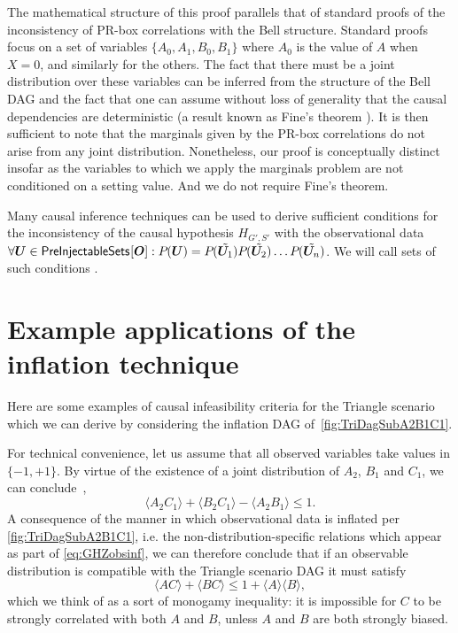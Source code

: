 The mathematical structure of this proof parallels that of standard proofs of the inconsistency of PR-box correlations with the Bell structure.  Standard proofs focus on a set of variables $\{A_0, A_1, B_0, B_1\}$ where $A_0$  is the value of $A$ when $X=0$, and similarly for the others.  The fact that there must be a joint distribution over these variables can be inferred from the structure of the Bell DAG and the fact that one can assume without loss of generality that the causal dependencies are deterministic (a result known as Fine's theorem \cite{FineTheorem}).  It is then sufficient to note that the marginals given by the PR-box correlations do not arise from any joint distribution.  Nonetheless, our proof is conceptually distinct insofar as the variables to which we apply the marginals problem are not conditioned on a setting value.  And we do not require Fine's theorem.  

Many causal inference techniques can be used to derive sufficient conditions for the inconsistency of the causal hypothesis $H_{G',S'}$ with the observational data $\forall \bm{U} \in {\operatorname{\mathsf{PreInjectableSets}}_{}}\lbrack\bm{O}\rbrack: {P_{}}\lparen\bm{U}\rparen = {P_{}}\lparen\tilde{\bm{U}_1}\rparen{P_{}}\lparen\tilde{\bm{U}_2}\rparen \dots {P_{}}\lparen\tilde{\bm{U}_n}\rparen$. We will call sets of such conditions  .   

\color{black}
\section{Example applications of the inflation technique}\label{sec:examplebaddistributions}

Here are some examples of causal infeasibility criteria for the Triangle scenario which we can derive by considering the inflation DAG of~\cref{fig:TriDagSubA2B1C1}.

For technical convenience, let us assume that all observed variables take values in $\{-1,+1\}$. By virtue of the existence of a joint distribution of $A_2$, $B_1$ and $C_1$, we can conclude~\cite{pitowsky_boole_1994,Pitowsky1989,kellerer_marginal_1964,leggett_garg_1985,araujo_cycle_2013},
\begin{equation}
	\label{eq:polymonogamyraw}
	\langle A_2 C_1\rangle + \langle B_2 C_1 \rangle - \langle A_2 B_1 \rangle \leq 1.
\end{equation}
A consequence of the manner in which observational data is inflated per \cref{fig:TriDagSubA2B1C1}, i.e. the non-distribution-specific relations which appear as part of \cref{eq:GHZobsinf}, we can therefore conclude that if an observable distribution is compatible with the Triangle scenario DAG it must satisfy
\begin{equation}
	\label{eq:polymonogamy}
	\langle A C\rangle + \langle B C\rangle \leq 1 + \langle A\rangle \langle B\rangle,
\end{equation}
which we think of as a sort of monogamy inequality: it is impossible for $C$ to be strongly correlated with both $A$ and $B$, unless $A$ and $B$ are both strongly biased.

